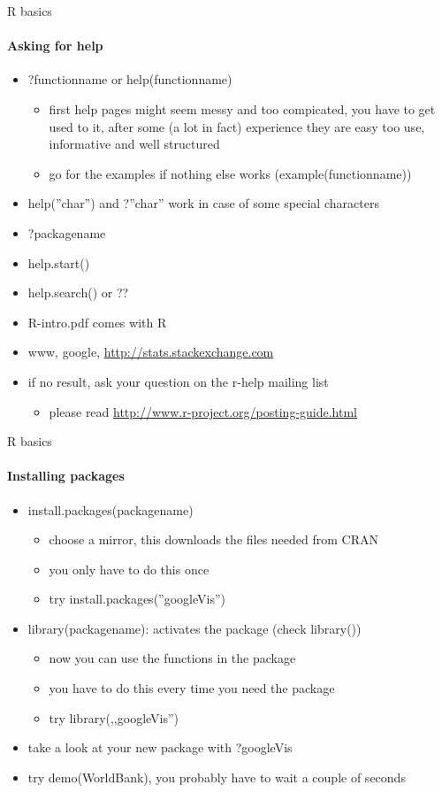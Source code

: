 \documentclass[10pt]{beamer}
\begin{document}
\begin{frame}{R basics}
\framesubtitle{Asking for help}
\begin{itemize}
\item ?functionname or help(functionname)
\begin{itemize}
\item first help pages might seem messy and too compicated, you have to get used to it, after some (a lot in fact) experience they are easy too use, informative and well structured
\item go for the examples if nothing else works (example(functionname))
\end{itemize}
\item help(''char'') and ?''char'' work in case of some special characters
\item ?packagename
\item help.start()
\item help.search() or ??
\item R-intro.pdf comes with R
\item www, google, \textcolor{blue}{\url{http://stats.stackexchange.com}}
\item if no result, ask your question on the r-help mailing list
\begin{itemize}
\item please read \textcolor{blue}{\url{http://www.r-project.org/posting-guide.html}}
\end{itemize}
\end{itemize}
\end{frame}

\begin{frame}{R basics}
\framesubtitle{Installing packages}
\begin{itemize}
\item install.packages(packagename)
\begin{itemize}
\item choose a mirror, this downloads the files needed from CRAN
\item you only have to do this once
\item try install.packages(''googleVis'')
\end{itemize}
\item library(packagename): activates the package (check library())
\begin{itemize}
\item now you can use the functions in the package
\item you have to do this every time you need the package
\item try library(,,googleVis'')
\end{itemize}
\item take a look at your new package with ?googleVis
\item try demo(WorldBank), you probably have to wait a couple of seconds
\end{itemize}
\end{frame}
\end{document}

